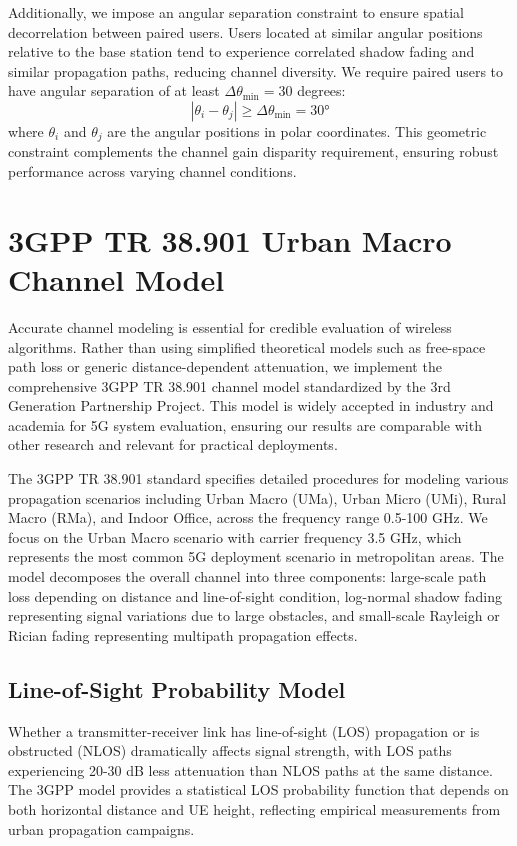 Additionally, we impose an angular separation constraint to ensure spatial decorrelation between paired users. Users located at similar angular positions relative to the base station tend to experience correlated shadow fading and similar propagation paths, reducing channel diversity. We require paired users to have angular separation of at least $\Delta\theta_{\min} = 30$ degrees:
\begin{equation}
|\theta_i - \theta_j| \geq \Delta\theta_{\min} = 30°
\end{equation}
where $\theta_i$ and $\theta_j$ are the angular positions in polar coordinates. This geometric constraint complements the channel gain disparity requirement, ensuring robust performance across varying channel conditions.

\section{3GPP TR 38.901 Urban Macro Channel Model}

Accurate channel modeling is essential for credible evaluation of wireless algorithms. Rather than using simplified theoretical models such as free-space path loss or generic distance-dependent attenuation, we implement the comprehensive 3GPP TR 38.901 channel model standardized by the 3rd Generation Partnership Project. This model is widely accepted in industry and academia for 5G system evaluation, ensuring our results are comparable with other research and relevant for practical deployments.

The 3GPP TR 38.901 standard specifies detailed procedures for modeling various propagation scenarios including Urban Macro (UMa), Urban Micro (UMi), Rural Macro (RMa), and Indoor Office, across the frequency range 0.5-100 GHz. We focus on the Urban Macro scenario with carrier frequency 3.5 GHz, which represents the most common 5G deployment scenario in metropolitan areas. The model decomposes the overall channel into three components: large-scale path loss depending on distance and line-of-sight condition, log-normal shadow fading representing signal variations due to large obstacles, and small-scale Rayleigh or Rician fading representing multipath propagation effects.

\subsection{Line-of-Sight Probability Model}

Whether a transmitter-receiver link has line-of-sight (LOS) propagation or is obstructed (NLOS) dramatically affects signal strength, with LOS paths experiencing 20-30 dB less attenuation than NLOS paths at the same distance. The 3GPP model provides a statistical LOS probability function that depends on both horizontal distance and UE height, reflecting empirical measurements from urban propagation campaigns.

